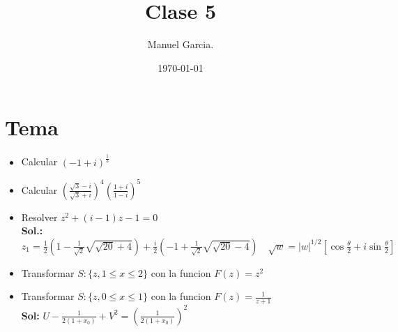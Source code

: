 \documentclass{article}
\title{Clase 5}
\author{Manuel Garcia.}
\date{\today}
\newcommand{\caja}[3]{%
  \begin{tcolorbox}[colback=#1!5!white,colframe=#1!25!black,title=#2]
    #3
  \end{tcolorbox}%
}
\begin{document}
\maketitle

\section{Tema}

\caja{blue}{Ejercicios }{
  \begin{itemize}
    \item Calcular $ (-1+i)^ {\frac{1}{3}} $
    \item Calcular $ \left(\frac{\sqrt{3 } -i }{\sqrt{3 } + i }\right)^ {4 }\left(\frac{1+i }{1- i }\right)^ {5 } $
    \item Resolver $ z ^2 + (i - 1 )z - 1 = 0  $ \\
      \textbf{Sol.:} $ z_1 = \frac{1}{2}\left(1-\frac{1}{\sqrt{2} }\sqrt{\sqrt{20 } + 4 } \right) + \frac{i }{2 }\left(-1+ \frac{1}{\sqrt{2 } }\sqrt{\sqrt{20 } - 4 } \right) \quad \sqrt{w }  = \left|w \right|^ {1/2 } \left[\cos{\frac{\theta }{2}} + i \sin{\frac{\theta }{2}}\right] $
    \item Transformar $ S: \{ z, 1\leq x \leq 2 \} $ con la funcion  $ F\left(z\right)=z ^2 $
    \item Transformar $ S: \{ z, 0 \leq x \leq 1 \}  $ con la funcion $ F \left(z\right)=\frac{1}{z+1 } $ \\
      \textbf{Sol: } $ U - \frac{1}{2(1+x_0)} + V ^2 = \left(\frac{1}{2(1+x_0)}\right)^2$
  \end{itemize}
}
\end{document}
